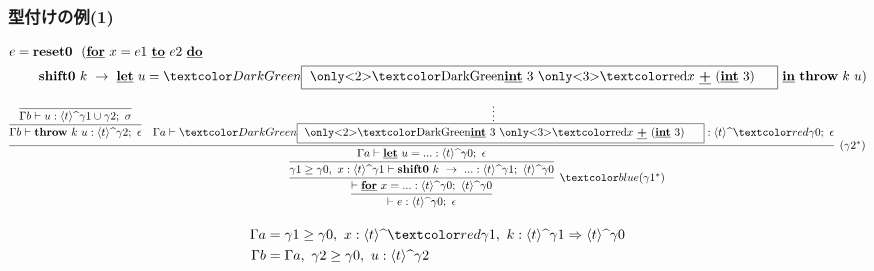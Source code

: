 \newcommand\boxterm{\framebox{
    \only<2>{\green{$\cint{3}$}}
    \only<3>{\red{$x~\cPlus~(\cint{3})$}}
    \phantom{A}
  }}

\begin{frame}
  \frametitle{型付けの例(1)}
  \begin{align*}
    e & = \Resetz ~~(\cfordo{x = e1}{e2} \\
      & \phantom{=}~~~ \Shiftz~k~\to~
        {\cLet~u=\green{\boxterm}~\cIn}~\Throw~k~u)
  \end{align*}

  \[
    \infer{\vdash e : \codeTs{t}{\gamma0};~\epsilon}
    {\infer[\blue{(\gamma1^*)}]{\vdash \cfor{x=...} :
        \codeTs{t}{\gamma0};~\codeTs{t}{\gamma0}}
      {\infer{\gamma1 \ord \gamma0,~x:\codeTs{t}{\gamma1}
          \vdash \Shiftz~k~\to~... :
          \codeTs{t}{\gamma1};~\codeTs{t}{\gamma0}}
        {\infer[(\gamma2^*)]{\Gamma a \vdash \cLet~u=...:\codeTs{t}{\gamma0};~\epsilon}
          {\infer{\Gamma b \vdash
              \Throw~k~u:\codeTs{t}{\gamma2};~\epsilon }
            {\infer{\Gamma b \vdash
                u:\codeTs{t}{\gamma1 \cup \gamma2};~ \sigma}
              {}
            }
            &\infer*{\Gamma a \vdash
              \green{\boxterm}:\codeTs{t}{\red{\gamma0}};~\epsilon}
            {}
          }
        }
      }
    }
  \]


  {\footnotesize
    \begin{align*}
      \Gamma a &= \gamma1 \ord \gamma0,~x:\codeTs{t}{\red{\gamma1}},
                 ~k: \contT{\codeTs{t}{\gamma1}}{\codeTs{t}{\gamma0}} \\
      \Gamma b &= \Gamma a,~\gamma2 \ord \gamma0,~u:\codeTs{t}{\gamma2}
    \end{align*}
  }

\end{frame}

